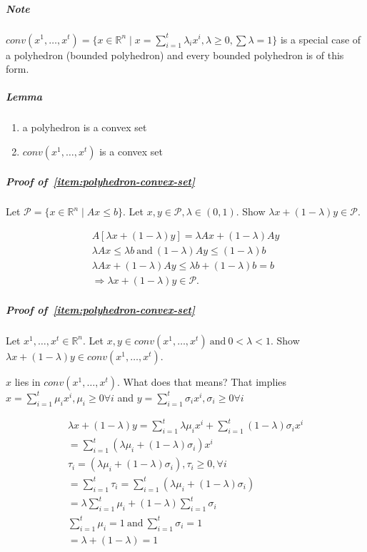 \documentclass[main]{subfiles}
\begin{document}
\subparagraph{Note}
$conv(x^{1}, \dots, x^{t}) = \{ x \in \mathbb{R}^{n} \mid x = \sum_{i=1}^{t}
\lambda_{i} x^{i}, \lambda \geq 0, \sum \lambda = 1 \}$ is a special case of a
polyhedron (bounded polyhedron) and every bounded polyhedron is of this form.

\subparagraph{Lemma}
\begin{enumerate}
\item \label{item:polyhedron-convex-set} a polyhedron is a convex set
\item \label{item:convex-hull-convex-set} $conv(x^{1}, \dots, x^{t})$ is a convex set
\end{enumerate}

\subparagraph{Proof of~\ref{item:polyhedron-convex-set}}
Let $\mathcal{P} = \{ x \in \mathbb{R}^{n} \mid Ax \leq b\}$. Let $x,y \in
\mathcal{P}, \lambda \in (0,1)$. Show $\lambda x + (1 - \lambda) y \in
\mathcal{P}$.

\begin{gather*}
A [\lambda x + (1-\lambda)y ] = \lambda Ax + (1-\lambda)Ay \\
 \lambda Ax \leq \lambda b \  \text{and}\  (1-\lambda)Ay \leq (1-\lambda) b \\
 \lambda Ax + (1-\lambda)Ay \leq \lambda b + (1-\lambda) b = b \\
 \Rightarrow \lambda x + (1-\lambda)y \in \mathcal{P}.
\end{gather*}

\subparagraph{Proof of~\ref{item:polyhedron-convex-set}}
Let $x^{1}, \dots, x^{t} \in \mathbb{R}^{n}$. Let $x,y \in conv(x^{1}, \dots,
x^{t})\ \text{and} \ 0 < \lambda < 1$. Show $\lambda x + (1-\lambda)y \in
conv(x^{1}, \dots, x^{t})$.

$x$ lies in $conv(x^{1}, \dots, x^{t})$. What does that means? That implies
$x = \sum_{i=1}^{t} \mu_{i} x^{i}, \mu_{i} \geq 0 \forall i$ and 
$y = \sum_{i=1}^{t} \sigma_{i} x^{i}, \sigma_{i} \geq 0 \forall i$

\begin{gather*}
\lambda x + (1-\lambda)y = \sum_{i=1}^{t} \lambda \mu_{i} x^{i} +
\sum_{i=1}^{t} (1-\lambda) \sigma_{i} x^{i} \\
= \sum_{i=1}^{t} (\lambda \mu_{i} + (1-\lambda) \sigma_{i}) x^{i} \\
\tau_{i} = (\lambda \mu_{i} + (1-\lambda) \sigma_{i}), \tau_{i} \geq 0, \forall i \\
= \sum_{i=1}^{t} \tau_{i} = \sum_{i=1}^{t} (\lambda \mu_{i} + (1-\lambda) \sigma_{i}) \\
= \lambda \sum_{i=1}^{t} \mu_{i} + (1-\lambda) \sum_{i=1}^{t} \sigma_{i} \\
\sum_{i=1}^{t} \mu_{i} = 1 \ \text{and} \ \sum_{i=1}^{t} \sigma_{i} = 1 \\
= \lambda + (1-\lambda) = 1
\end{gather*}
\end{document}
